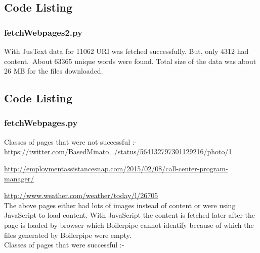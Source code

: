 \documentclass{article}
\begin{document}
\subsection{Code Listing}
\subsubsection{fetchWebpages2.py}


\newpage

With JusText data for 11062 URI was fetched successfully. But, only 4312 had content.\
About 63365 unique words were found. Total size of the data was about 26 MB for the files downloaded.\

\subsection{Code Listing}
\subsubsection{fetchWebpages.py}


\newpage

\clearpage

Classes of pages that were not successful :-\\

\url{https://twitter.com/BasedMinato_/status/564132797301129216/photo/1}\

\url{http://employmentassistancesnap.com/2015/02/08/call-center-program-manager/}\

\url{http://www.weather.com/weather/today/l/26705}\\

The above pages either had lots of images instead of content or were using JavaScript to load content. With JavaScript the content is fetched later after the page is loaded by browser which Boilerpipe cannot identify because of which the files generated by Boilerpipe were empty.\\

Classes of pages that were successful :-\\
\end{document}
